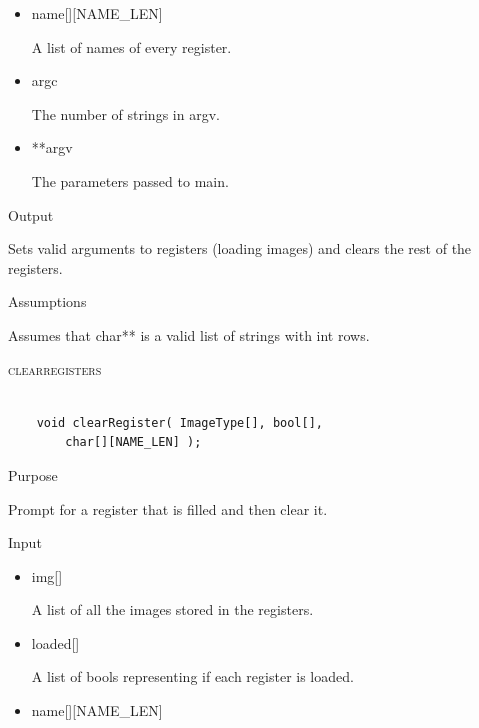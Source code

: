 \documentclass[pdftex, 11pt]{article}
\begin{document}
\begin{description}
\begin{description}
\begin{itemize}
					\item{name[][NAME\_LEN]}

						A list of names of every register.
					
					\item{argc}

						The number of strings in argv.

					\item{**argv}

						The parameters passed to main.

				\end{itemize}

			\item{Output}

				Sets valid arguments to registers (loading images) and
				clears the rest of the registers.

			\item{Assumptions}

				Assumes that char** is a valid list of strings with int
				rows.

		\end{description}



	\item{\textsc{clearregisters}}

		\begin{lstlisting}

	void clearRegister( ImageType[], bool[], 
		char[][NAME_LEN] );
		\end{lstlisting}

		\begin{description}
			\item{Purpose}

				Prompt for a register that is filled and then clear it.
				
			\item{Input}

				\begin{itemize}

					\item{img[]}

						A list of all the images stored in the registers.

					\item{loaded[]}

						A list of bools representing if each register is loaded.

					\item{name[][NAME\_LEN]}


\end{itemize}
\end{description}
\end{description}
\end{document}
